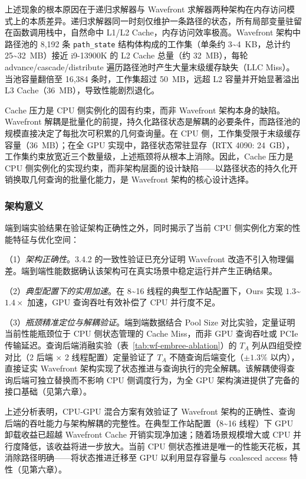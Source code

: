 上述现象的根本原因在于递归求解器与 Wavefront 求解器两种架构在内存访问模式上的本质差异。递归求解器同一时刻仅维护一条路径的状态，所有局部变量驻留在函数调用栈中，自然命中 L1/L2 Cache，内存访问效率极高。Wavefront 架构中路径池的 8{,}192 条 \texttt{path\_state} 结构体构成的工作集（单条约 3\textasciitilde 4~KB，总计约 25\textasciitilde 32~MB）接近 i9-13900K 的 L2 Cache 总量（约 32~MB），每轮 advance/cascade/distribute 遍历路径池时产生大量末级缓存缺失（LLC Miss）。当池容量翻倍至 16{,}384 条时，工作集超过 50~MB，远超 L2 容量并开始显著溢出 L3 Cache（36~MB），导致性能剧烈退化。

Cache 压力是 CPU 侧实例化的固有约束，而非 Wavefront 架构本身的缺陷。Wavefront 解耦是批量化的前提，持久化路径状态是解耦的必要条件，而路径池的规模直接决定了每批次可积累的几何查询量。在 CPU 侧，工作集受限于末级缓存容量（36~MB）；在全 GPU 实现中，路径状态常驻显存（RTX 4090: 24~GB），工作集约束放宽近三个数量级，上述瓶颈将从根本上消除。因此，Cache 压力是 CPU 侧实例化的实现约束，而非架构层面的设计缺陷——以路径状态的持久化开销换取几何查询的批量化能力，是 Wavefront 架构的核心设计选择。

\subsubsection{架构意义}

端到端实验结果在验证架构正确性之外，同时揭示了当前 CPU 侧实例化方案的性能特征与优化空间：

（1）\emph{架构正确性}。3.4.2 的一致性验证已充分证明 Wavefront 改造不引入物理偏差。端到端性能数据确认该架构可在真实场景中稳定运行并产生正确结果。

（2）\emph{典型配置下的实用加速}。在 8\textasciitilde 16 线程的典型工作站配置下，Ours 实现 $1.3$\textasciitilde$1.4\times$ 加速，GPU 查询吞吐有效补偿了 CPU 并行度不足。

（3）\emph{瓶颈精准定位与解耦验证}。端到端数据结合 Pool Size 对比实验，定量证明当前性能瓶颈位于 CPU 侧状态管理的 Cache Miss，而非 GPU 查询吞吐或 PCIe 传输延迟。查询后端消融实验（表~\ref{tab:wf-embree-ablation}）的 $T_A$ 列从四组受控对比（2 后端 $\times$ 2 线程配置）定量验证了 $T_A$ 不随查询后端变化（$\pm 1.3\%$ 以内），直接证实 Wavefront 架构实现了状态推进与查询执行的完全解耦。该解耦使得查询后端可独立替换而不影响 CPU 侧调度行为，为全 GPU 架构演进提供了完备的接口基础（见第六章）。

上述分析表明，CPU-GPU 混合方案有效验证了 Wavefront 架构的正确性、查询后端的吞吐能力与架构解耦的完整性。在典型工作站配置（8\textasciitilde 16 线程）下 GPU 卸载收益已超越 Wavefront Cache 开销实现净加速；随着场景规模增大或 CPU 并行度降低，该收益将进一步放大。当前 CPU 侧状态推进是唯一的性能天花板，其消除路径明确——将状态推进迁移至 GPU 以利用显存容量与 coalesced access 特性（见第六章）。

